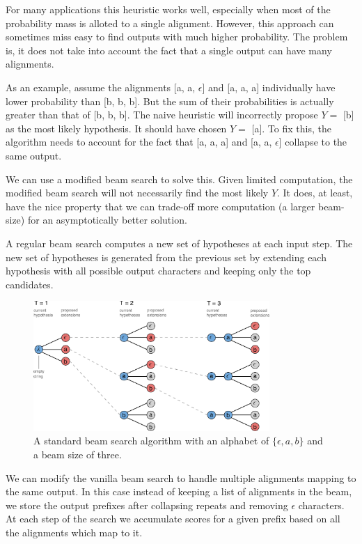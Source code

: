 For many applications this heuristic works well, especially when most of the
probability mass is alloted to a single alignment. However, this approach can
sometimes miss easy to find outputs with much higher probability. The problem
is, it does not take into account the fact that a single output can have many
alignments.

As an example, assume the alignments [a, a, $\epsilon$] and [a, a, a]
individually have lower probability than [b, b, b]. But the sum of their
probabilities is actually greater than that of [b, b, b]. The naive heuristic
will incorrectly propose $Y =$ [b] as the most likely hypothesis. It should
have chosen $Y =$ [a].  To fix this, the algorithm needs to account for the
fact that [a, a, a] and [a, a, $\epsilon$] collapse to the same output.

We can use a modified beam search to solve this. Given limited computation, the
modified beam search will not necessarily find the most likely $Y$. It does, at
least, have the nice property that we can trade-off more computation (a larger
beam-size) for an asymptotically better solution.

A regular beam search computes a new set of hypotheses at each input step. The
new set of hypotheses is generated from the previous set by extending each
hypothesis with all possible output characters and keeping only the top
candidates.

\begin{figure}
\centering
\includegraphics[width=0.8\textwidth]{background/figures/beam_search.pdf}
\caption{A standard beam search algorithm with an alphabet of $\{\epsilon, a,
    b\}$ and a beam size of three.}
\end{figure}

We can modify the vanilla beam search to handle multiple alignments mapping to
the same output. In this case instead of keeping a list of alignments in the
beam, we store the output prefixes after collapsing repeats and removing
$\epsilon$ characters. At each step of the search we accumulate scores for a
given prefix based on all the alignments which map to it.

